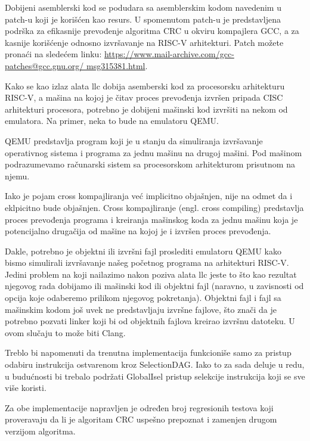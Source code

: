 \documentclass[12pt,oneside]{memoir}
\begin{document}

Dobijeni asemblerski kod se podudara sa asemblerskim kodom navedenim u patch-u 
koji je korišćen kao resurs. U spomenutom patch-u je predstavljena podrška za 
efikasnije prevođenje algoritma CRC u okviru kompajlera GCC, a za kasnije 
korišćenje odnosno izvršavanje na RISC-V arhitekturi. Patch možete pronaći na 
sledećem linku: \url{https://www.mail-archive.com/gcc-patches@gcc.gnu.org/
msg315381.html}.

Kako se kao izlaz alata llc dobija asemberski kod za procesorsku arhitekturu RISC-V, a mašina na 
kojoj je čitav proces prevođenja izvršen pripada CISC arhitekturi procesora, potrebno je dobijeni 
mašinski kod izvršiti na nekom od emulatora. Na primer, neka to bude na emulatoru QEMU\cite{qemu}.

QEMU predstavlja program koji je u stanju da simuliranja izvršavanje operativnog sistema i 
programa za jednu mašinu na drugoj mašini. Pod mašinom podrazumevamo računarski sistem sa 
procesorskom arhitekturom prisutnom na njemu.

Iako je pojam cross kompajliranja već implicitno objašnjen, nije na odmet da i eklpicitno bude 
objašnjen. Cross kompajliranje (engl. cross compiling) predstavlja proces prevođenja programa i 
kreiranja mašinskog koda za jednu mašinu koja je potencijalno drugačija od mašine na kojoj je i
izvršen proces prevođenja.

Dakle, potrebno je objektni ili izvršni fajl proslediti emulatoru QEMU kako bismo simulirali 
izvršavanje našeg početnog programa na arhitekturi RISC-V. 
Jedini problem na koji nailazimo nakon poziva alata llc jeste to što kao rezultat njegovog rada 
dobijamo ili mašinski kod ili objektni fajl (naravno, u zavisnosti od opcija koje odaberemo 
prilikom njegovog pokretanja). Objektni fajl i fajl sa mašinskim kodom još uvek ne predstavljaju 
izvršne fajlove, što znači da je potrebno pozvati linker koji bi od objektnih fajlova kreirao 
izvršnu datoteku. U ovom slučaju to može biti Clang.

Treblo bi napomenuti da trenutna implementacija funkcioniše samo za pristup odabiru instrukcija 
ostvarenom kroz SelectionDAG. Iako to za sada deluje u redu, u budućnosti  bi trebalo podržati 
GlobalIsel pristup selekcije instrukcija koji se sve više koristi.

Za obe implementacije napravljen je određen broj regresionih testova koji proveravaju da li je 
algoritam CRC uspešno prepoznat i zamenjen drugom verzijom algoritma.
\end{document}
